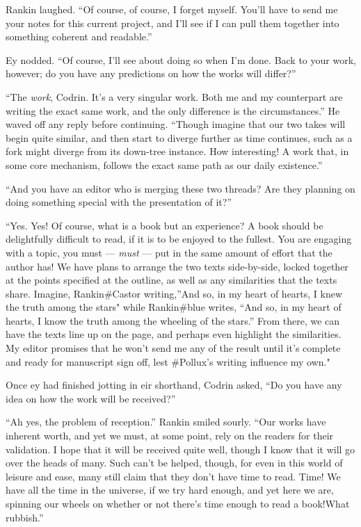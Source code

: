 Rankin laughed. ``Of course, of course, I forget myself. You'll have to send me your notes for this current project, and I'll see if I can pull them together into something coherent and readable.''

Ey nodded. ``Of course, I'll see about doing so when I'm done. Back to your work, however; do you have any predictions on how the works will differ?''

``The \emph{work}, Codrin. It's a very singular work. Both me and my counterpart are writing the exact same work, and the only difference is the circumstances.'' He waved off any reply before continuing. ``Though imagine that our two takes will begin quite similar, and then start to diverge further as time continues, such as a fork might diverge from its down-tree instance. How interesting! A work that, in some core mechanism, follows the exact same path as our daily existence.''

``And you have an editor who is merging these two threads? Are they planning on doing something special with the presentation of it?''

``Yes. Yes! Of course, what is a book but an experience? A book should be delightfully difficult to read, if it is to be enjoyed to the fullest. You are engaging with a topic, you must — \emph{must} — put in the same amount of effort that the author has! We have plans to arrange the two texts side-by-side, locked together at the points specified at the outline, as well as any similarities that the texts share. Imagine, Rankin\#Castor writing,''And so, in my heart of hearts, I knew the truth among the stars" while Rankin\#blue writes, ``And so, in my heart of hearts, I know the truth among the wheeling of the stars.'' From there, we can have the texts line up on the page, and perhaps even highlight the similarities. My editor promises that he won't send me any of the result until it's complete and ready for manuscript sign off, lest \#Pollux's writing influence my own."

Once ey had finished jotting in eir shorthand, Codrin asked, ``Do you have any idea on how the work will be received?''

``Ah yes, the problem of reception.'' Rankin smiled sourly. ``Our works have inherent worth, and yet we must, at some point, rely on the readers for their validation. I hope that it will be received quite well, though I know that it will go over the heads of many. Such can't be helped, though, for even in this world of leisure and ease, many still claim that they don't have time to read. Time! We have all the time in the universe, if we try hard enough, and yet here we are, spinning our wheels on whether or not there's time enough to read a book!What rubbish.''

